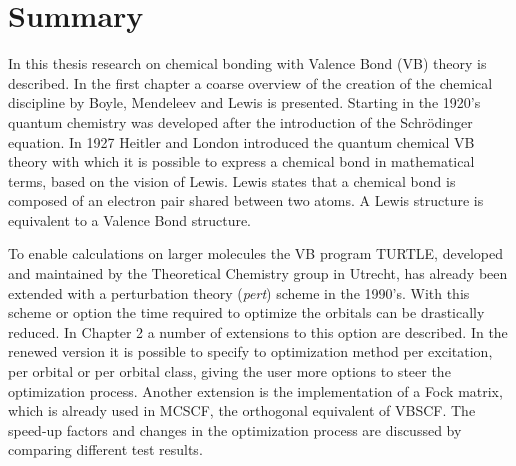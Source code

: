 \chapter*{Summary}
\label{summary}
\fancyhead[RO]{\thepage}
\fancyhead[LE]{\thepage}

In this thesis research on chemical bonding with Valence Bond (VB) theory is described. In the first chapter a coarse overview of the creation of the chemical discipline by Boyle, Mendeleev and Lewis is presented. Starting in the 1920's quantum chemistry was developed after the introduction of the Schr\"{o}dinger equation. In 1927 Heitler and London introduced the quantum chemical VB theory with which it is possible to express a chemical bond in mathematical terms, based on the vision of Lewis. Lewis states that a chemical bond is composed of an electron pair shared between two atoms. A Lewis structure is equivalent to a Valence Bond structure. 

To enable calculations on larger molecules the VB program TURTLE, developed and maintained by the Theoretical Chemistry group in Utrecht, has already been extended with a perturbation theory (\textit{pert}) scheme in the 1990's. With this scheme or option the time required to optimize the orbitals can be drastically reduced. In Chapter 2 a number of extensions to this option are described. In the renewed version it is possible to specify to optimization method per excitation, per orbital or per orbital class, giving the user more options to steer the optimization process. Another extension is the implementation of a Fock matrix, which is already used in MCSCF, the orthogonal equivalent of VBSCF. The speed-up factors and changes in the optimization process are discussed by comparing different test results. 

